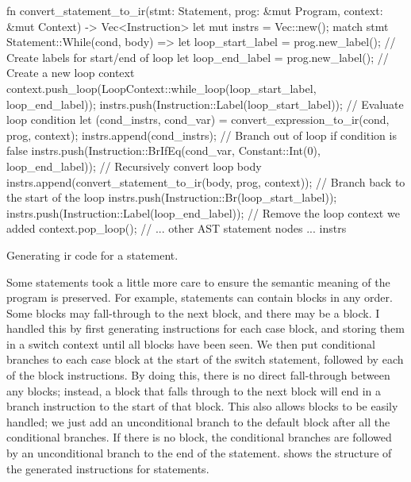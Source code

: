 \documentclass[00-main.tex]{subfiles}
\begin{document}
\begin{listing}[t]
  \begin{RustListing}
    fn convert_statement_to_ir(stmt: Statement, prog: &mut Program, context: &mut Context)
            -> Vec<Instruction> {
        let mut instrs = Vec::new();
        match stmt {
            Statement::While(cond, body) => {
                let loop_start_label = prog.new_label(); // Create labels for start/end of loop
                let loop_end_label = prog.new_label();
                // Create a new loop context
                context.push_loop(LoopContext::while_loop(loop_start_label, loop_end_label));
                instrs.push(Instruction::Label(loop_start_label));
                // Evaluate loop condition
                let (cond_instrs, cond_var) = convert_expression_to_ir(cond, prog, context);
                instrs.append(cond_instrs);
                // Branch out of loop if condition is false
                instrs.push(Instruction::BrIfEq(cond_var, Constant::Int(0), loop_end_label));
                // Recursively convert loop body
                instrs.append(convert_statement_to_ir(body, prog, context));
                // Branch back to the start of the loop
                instrs.push(Instruction::Br(loop_start_label));
                instrs.push(Instruction::Label(loop_end_label));
                // Remove the loop context we added
                context.pop_loop();
            }
            // ... other AST statement nodes ...
        }
        instrs
    }
  \end{RustListing}
  \caption{Generating \gls{ir} code for a  statement.}
  \label{lst:convert while stmt to IR pseudocode}
\end{listing}

Some statements took a little more care to ensure the semantic meaning of the program is preserved.
For example,  statements can contain  blocks in any order.
Some blocks may fall-through to the next block, and there may be a  block.
I handled this by first generating instructions for each case block, and storing them in a switch context until all blocks have been seen.
We then put conditional branches to each case block at the start of the switch statement, followed by each of the block instructions.
By doing this, there is no direct fall-through between any blocks; instead, a block that falls through to the next block will end in a branch instruction to the start of that block.
This also allows  blocks to be easily handled; we just add an unconditional branch to the default block after all the conditional branches.
If there is no  block, the conditional branches are followed by an unconditional branch to the end of the  statement.
 shows the structure of the generated instructions for  statements.
\end{document}
